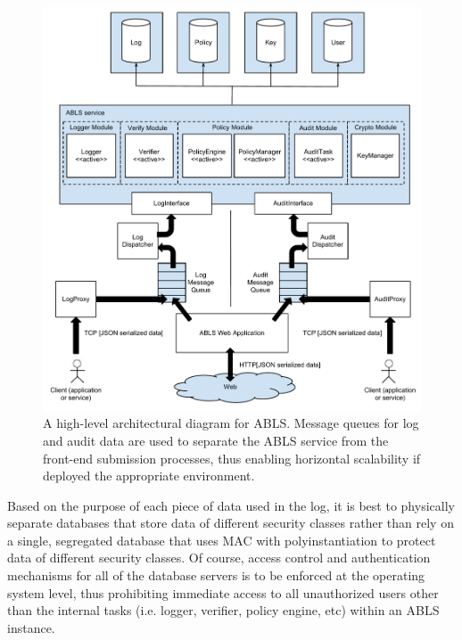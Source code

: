 \documentclass{sig-alternate}
\begin{document}
\begin{figure}[htb!]
\begin{center}
\includegraphics[width=5in]{images/deployment.pdf}
\caption{A high-level architectural diagram for ABLS. Message queues for log and audit data are used to separate the ABLS service from the front-end submission processes, thus enabling horizontal scalability if deployed the appropriate environment.}
\label{fig:deployment}
\end{center}
\end{figure}

Based on the purpose of each piece of data used in the log, it is best to physically separate databases
that store data of different security classes rather than rely on a single, segregated database that uses MAC with 
polyinstantiation to protect data of different security classes. Of course, access control
and authentication mechanisms for all of the database servers is to be enforced at the operating system level, thus
prohibiting immediate access to all unauthorized users other than the internal tasks (i.e. logger, verifier, policy engine, etc) 
within an ABLS instance. 
\end{document}
